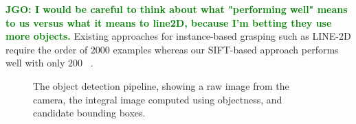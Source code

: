 \documentclass{article}
\newcommand{\stnote}[1]{\textcolor{blue}{\textbf{ST: #1}}}
\newcommand{\jgonote}[1]{\textcolor{green}{\textbf{JGO: #1}}}
\begin{document}
\jgonote{I would be careful to think about what "performing well" means to
us versus what it means to line2D, because I'm betting they use more objects.}
Existing approaches for
instance-based grasping such as LINE-2D require the order of $2000$ examples
whereas our SIFT-based approach performs well with only $200$
~\citep{hinterstoisser12}.





\begin{figure}
%
%
%
\caption{The object detection pipeline, showing a raw image from the
  camera, the integral image computed using objectness, and candidate
  bounding boxes.\label{fig:object_detection}}
\end{figure}
\end{document}
